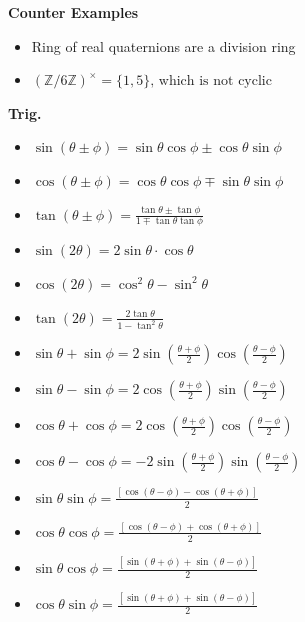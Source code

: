 \documentclass[a4paper, 10pt]{article}
\begin{document}
\begin{multicols*}{3}
\textbf{Counter Examples}
\begin{itemize}[label=\textbullet, labelsep=0.3em, leftmargin=1em]
    \item Ring of real quaternions are a division ring
    \item $(\mathbb{Z} / 6 \mathbb{Z})^{\times}=\{1,5\} \text {, which is not cyclic }$
\end{itemize}

\textbf{Trig.}
\begin{itemize}[label=\textbullet, labelsep=0.3em, leftmargin=1em]
    \item $\sin (\theta \pm \phi)=\sin \theta \cos \phi \pm \cos \theta \sin \phi$
    \item $\cos (\theta \pm \phi)=\cos \theta \cos \phi \mp \sin \theta \sin \phi$
    \item $\tan (\theta \pm \phi)=\frac{\tan \theta \pm \tan \phi}{1 \mp \tan \theta \tan \phi}$
    \item $\sin(2\theta) = 2 \sin \theta \cdot \cos \theta$
    \item $\cos(2\theta) = \cos^2 \theta - \sin^2 \theta$
    \item $\tan(2\theta) = \frac{2 \tan \theta}{1 - \tan^2 \theta}$
    \item $\sin \theta+\sin \phi=2 \sin \left(\frac{\theta+\phi}{2}\right) \cos \left(\frac{\theta-\phi}{2}\right)$
    \item $\sin \theta-\sin \phi=2 \cos \left(\frac{\theta+\phi}{2}\right) \sin \left(\frac{\theta-\phi}{2}\right)$
    \item $\cos \theta+\cos \phi=2 \cos \left(\frac{\theta+\phi}{2}\right) \cos \left(\frac{\theta-\phi}{2}\right)$
    \item $\cos \theta-\cos \phi=-2 \sin \left(\frac{\theta+\phi}{2}\right) \sin \left(\frac{\theta-\phi}{2}\right)$
    \item $\sin \theta \sin \phi=\frac{[\cos (\theta-\phi)-\cos (\theta+\phi)]}{2}$
    \item $\cos \theta \cos \phi=\frac{[\cos (\theta-\phi)+\cos (\theta+\phi)]}{2}$
    \item $\sin \theta \cos \phi=\frac{[\sin (\theta+\phi)+\sin (\theta-\phi)]}{2}$
    \item $\cos \theta \sin \phi=\frac{[\sin (\theta+\phi)+\sin (\theta-\phi)]}{2}$
\end{itemize}

\end{multicols*}
\end{document}
